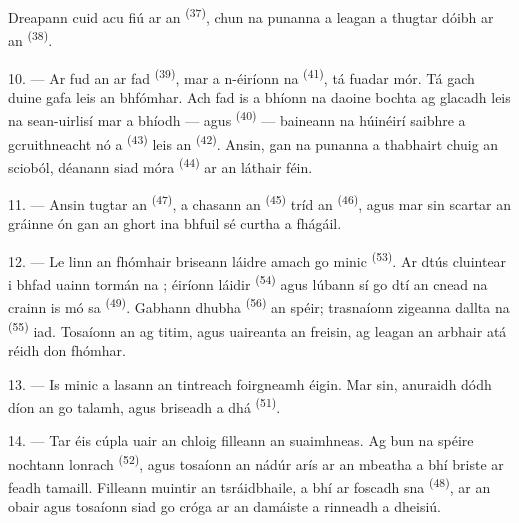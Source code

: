 Dreapann cuid acu fiú ar an  \textsuperscript{(37)}, chun na punanna
a leagan a thugtar dóibh ar an  \textsuperscript{(38)}.

10. --- Ar fud an  ar fad \textsuperscript{(39)}, mar a n-éiríonn
na  \textsuperscript{(41)}, tá fuadar mór. Tá gach duine gafa leis
an bhfómhar. Ach fad is a bhíonn na daoine bochta ag glacadh leis na sean-uirlisí
mar a bhíodh ---  agus 
\textsuperscript{(40)} --- baineann na húinéirí saibhre a gcruithneacht nó a
 \textsuperscript{(43)} leis an 
\textsuperscript{(42)}. Ansin, gan na punanna a thabhairt chuig an scioból,
déanann siad  móra \textsuperscript{(44)} ar an láthair féin.

11. --- Ansin tugtar an  \textsuperscript{(47)}, a
chasann an  \textsuperscript{(45)} tríd an  \textsuperscript{(46)}, agus mar sin scartar an gráinne ón
 gan an ghort ina bhfuil sé curtha a fhágáil.

\VUsaut{5.0mm}
\VUsaut{3.4mm}

12. --- Le linn an fhómhair briseann  láidre amach go minic
\textsuperscript{(53)}. Ar dtús cluintear i bhfad uainn tormán na
; éiríonn  láidir \textsuperscript{(54)} agus
lúbann sí go dtí an cnead na crainn is mó sa 
\textsuperscript{(49)}. Gabhann  dhubha \textsuperscript{(56)} an
spéir; trasnaíonn zigeanna dallta na  \textsuperscript{(55)} iad.
Tosaíonn an  ag titim, agus uaireanta an  freisin, ag leagan an arbhair atá réidh don fhómhar.

13. --- Is minic a lasann an tintreach foirgneamh éigin. Mar sin, anuraidh dódh
díon an   go talamh, agus briseadh a
dhá  \textsuperscript{(51)}.

14. --- Tar éis cúpla uair an chloig filleann an suaimhneas. Ag bun na spéire
nochtann  lonrach \textsuperscript{(52)}, agus tosaíonn an
nádúr arís ar an mbeatha a bhí briste ar feadh tamaill. Filleann muintir an
tsráidbhaile, a bhí ar foscadh sna  \textsuperscript{(48)}, ar an
obair agus tosaíonn siad go cróga ar an damáiste a rinneadh a dheisiú.

